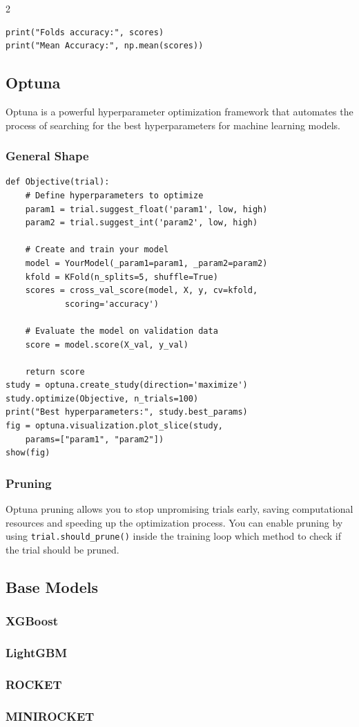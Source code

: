 \documentclass[5pt]{article}
\begin{document}
\begin{multicols}{2}
\begin{verbatim}
print("Folds accuracy:", scores)
print("Mean Accuracy:", np.mean(scores))
\end{verbatim}

\subsection{Optuna}
Optuna is a powerful hyperparameter optimization framework that automates the process of searching for the best hyperparameters for machine learning models.
\subsubsection{General Shape}
\begin{verbatim}
def Objective(trial):
    # Define hyperparameters to optimize
    param1 = trial.suggest_float('param1', low, high)
    param2 = trial.suggest_int('param2', low, high)
        
    # Create and train your model
    model = YourModel(_param1=param1, _param2=param2)
    kfold = KFold(n_splits=5, shuffle=True)
    scores = cross_val_score(model, X, y, cv=kfold, 
            scoring='accuracy')

    # Evaluate the model on validation data
    score = model.score(X_val, y_val)
        
    return score
study = optuna.create_study(direction='maximize')
study.optimize(Objective, n_trials=100)
print("Best hyperparameters:", study.best_params)
fig = optuna.visualization.plot_slice(study, 
    params=["param1", "param2"])
show(fig)
\end{verbatim}

\subsubsection{Pruning}
Optuna pruning allows you to stop unpromising trials early, saving computational resources and speeding up the optimization process.
You can enable pruning by using \texttt{trial.should\_prune()} inside the training loop which method to check if the trial should be pruned.

\subsection{Base Models}
\subsubsection{XGBoost}
\subsubsection{LightGBM}
\subsubsection{ROCKET}
\subsubsection{MINIROCKET}




\end{multicols}
\end{document}
